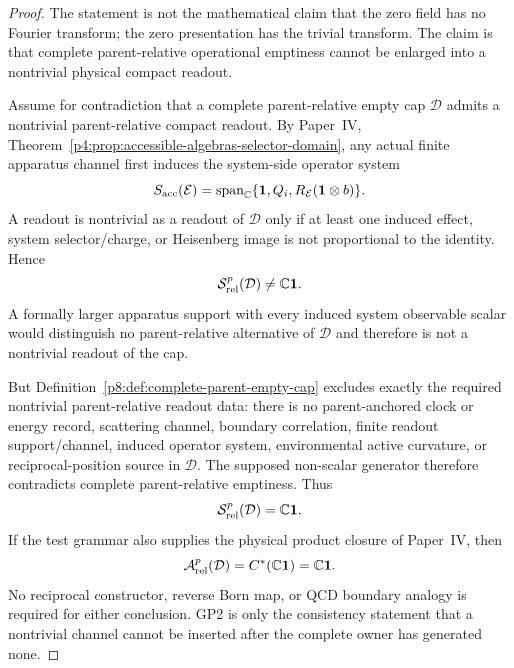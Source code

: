 \documentclass[12pt,a4paper]{article}
\begin{document}
\begin{proof}
The statement is not the mathematical claim that the zero field has no Fourier
transform; the zero presentation has the trivial transform.  The claim is
that complete parent-relative operational emptiness cannot be enlarged into a
nontrivial physical compact readout.

Assume for contradiction that a complete parent-relative empty cap
\(\mathcal D\) admits a nontrivial parent-relative compact readout.  By
Paper~IV, Theorem~\ref{p4:prop:accessible-algebras-selector-domain}, any actual
finite apparatus channel first induces the system-side operator system
\[
 S_{\rm acc}(\mathcal E)
 =\operatorname{span}_{\mathbb C}
 \{\mathbf1,Q_i,R_{\mathcal E}(\mathbf1\otimes b)\}.
\]
A readout is nontrivial as a readout of \(\mathcal D\) only if at least one
induced effect, system selector/charge, or Heisenberg image is not proportional
to the identity.  Hence
\[
 \mathcal S^{p}_{\rm rel}(\mathcal D)\neq\mathbb C\mathbf1.
\]
A formally larger apparatus support with every induced system observable
scalar would distinguish no parent-relative alternative of \(\mathcal D\) and
therefore is not a nontrivial readout of the cap.

But Definition~\ref{p8:def:complete-parent-empty-cap} excludes exactly the
required nontrivial parent-relative readout data: there is no parent-anchored
clock or energy record, scattering channel, boundary correlation, finite
readout support/channel, induced operator system, environmental active
curvature, or reciprocal-position source in \(\mathcal D\).  The supposed
non-scalar generator therefore contradicts complete parent-relative
emptiness.  Thus
\[
 \mathcal S^{p}_{\rm rel}(\mathcal D)=\mathbb C\mathbf1.
\]
If the test grammar also supplies the physical product closure of Paper~IV,
then
\[
 \mathcal A^{p}_{\rm rel}(\mathcal D)
 =C^*(\mathbb C\mathbf1)=\mathbb C\mathbf1.
\]
No reciprocal constructor, reverse Born map, or QCD boundary analogy is
required for either conclusion.  GP2 is only the consistency statement that a
nontrivial channel cannot be inserted after the complete owner has generated
none.
\end{proof}
\end{document}
